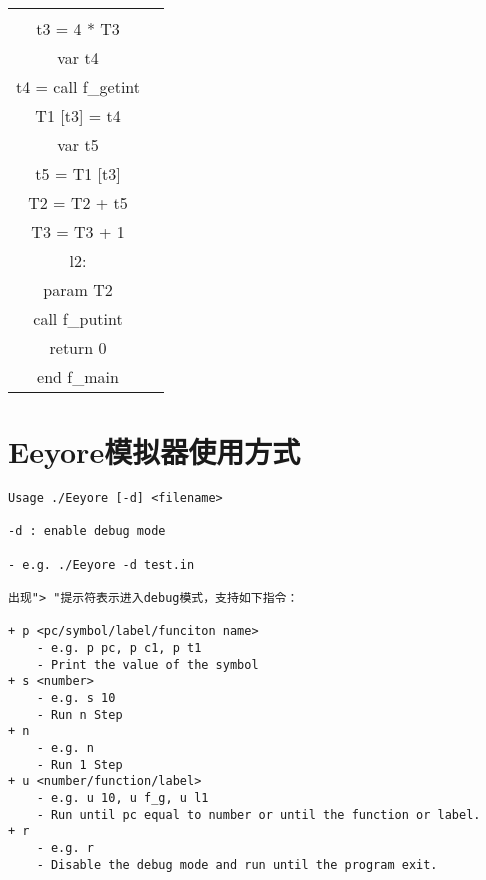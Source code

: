 \documentclass{ctexart}
\newenvironment{typewriterfont}{\ttfamily}{\par}
\begin{document}
\begin{table}[H]
\begin{typewriterfont}
\begin{tabular}{|c|c|}
{var t3\\
t3 = 4 * T3\\
var t4\\
t4 = call f\_getint\\
T1 [t3] = t4\\
var t5\\
t5 = T1 [t3]\\
T2 = T2 + t5\\
T3 = T3 + 1\\
l2:\\
param T2\\
call f\_putint\\
return 0\\
end f\_main
} \\
        \hline
    \end{tabular}
    \end{typewriterfont}
\end{table}

\newpage
\section{Eeyore模拟器使用方式}
\begin{typewriterfont}
\begin{lstlisting}
Usage ./Eeyore [-d] <filename>

-d : enable debug mode

- e.g. ./Eeyore -d test.in

出现"> "提示符表示进入debug模式，支持如下指令： 

+ p <pc/symbol/label/funciton name>     
    - e.g. p pc, p c1, p t1
    - Print the value of the symbol
+ s <number>
    - e.g. s 10
    - Run n Step
+ n
    - e.g. n
    - Run 1 Step
+ u <number/function/label>
    - e.g. u 10, u f_g, u l1
    - Run until pc equal to number or until the function or label.
+ r
    - e.g. r
    - Disable the debug mode and run until the program exit.
\end{lstlisting}
\end{typewriterfont}
\end{document}

